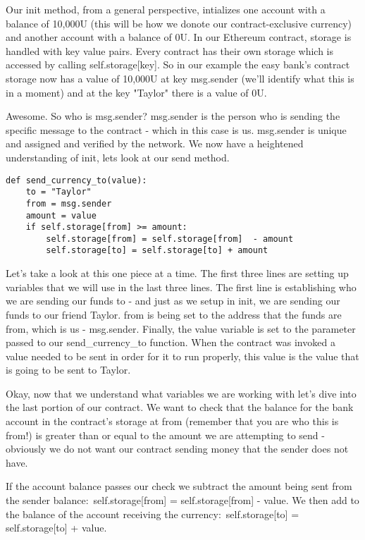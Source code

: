 \documentclass[12pt]{article}
\begin{document}
Our init method, from a general perspective, intializes one account with a balance of 10,000U (this will be how we donote our contract-exclusive currency) and another account with a balance of 0U. In our Ethereum contract, storage is handled with key value pairs. Every contract has their own storage which is accessed by calling self.storage[key]. So in our example the easy bank's contract storage now has a value of 10,000U at key msg.sender (we'll identify what this is in a moment) and at the key "Taylor" there is a value of 0U. 

 Awesome. So who is msg.sender? msg.sender is the person who is sending the specific message to the contract - which in this case is us. msg.sender is unique and assigned and verified by the network. We now have a heightened understanding of init, lets look at our send method.



\begin{lstlisting}[frame=single]
def send_currency_to(value):
	to = "Taylor"
	from = msg.sender
	amount = value
	if self.storage[from] >= amount:
		self.storage[from] = self.storage[from]  - amount
		self.storage[to] = self.storage[to] + amount
\end{lstlisting}

Let's take a look at this one piece at a time. The first three lines are setting up variables that we will use in the last three lines. The first line is establishing who we are sending our funds to - and just as we setup in init, we are sending our funds to our friend Taylor. 
from is being set to the address that the funds are from, which is us - msg.sender. Finally, the value variable is set to the parameter passed to our send\_currency\_to function. When the contract was invoked a value needed to be sent in order for it to run properly, this value is the value that is going to be sent to Taylor.

Okay, now that we understand what variables we are working with let's dive into the last portion of our contract. We want to check that the balance for the bank account in the contract's storage at from (remember that you are who this is from!) is greater than or equal to the amount we are attempting to send - obviously we do not want our contract sending money that the sender does not have.

If the account balance passes our check we subtract the amount being sent from the sender balance: self.storage[from] = self.storage[from] - value. We then add to the balance of the account receiving the currency: self.storage[to] = self.storage[to] + value.
\end{document}
